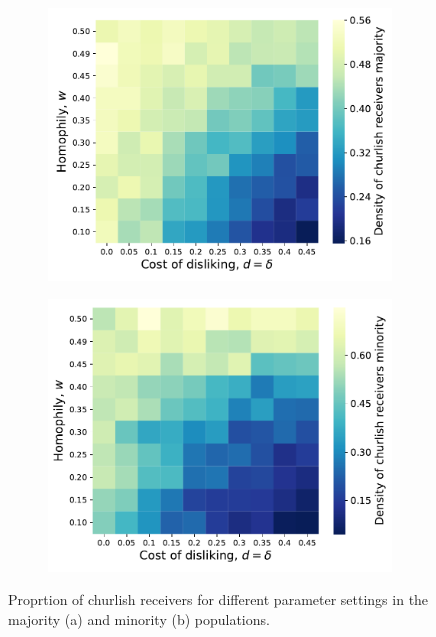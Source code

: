 \documentclass[11pt,letterpaper]{article}
\begin{document}
\begin{figure}[H]
  \centering
  \begin{subfigure}{0.49\textwidth}
    \centering
    \includegraphics[width=\textwidth]{prelim/Figures/majority_receivers.pdf}
    \caption{}
    \label{fig:}
  \end{subfigure}
  \begin{subfigure}{0.49\textwidth}
    \centering
    \includegraphics[width=\textwidth]{prelim/Figures/minority_receivers.pdf}
    \caption{}
    \label{fig:}
  \end{subfigure}
  \caption{Proprtion of churlish receivers for different parameter settings in the
    majority (a) and minority (b) populations.}
  \label{fig:regressions}
\end{figure}
\end{document}
